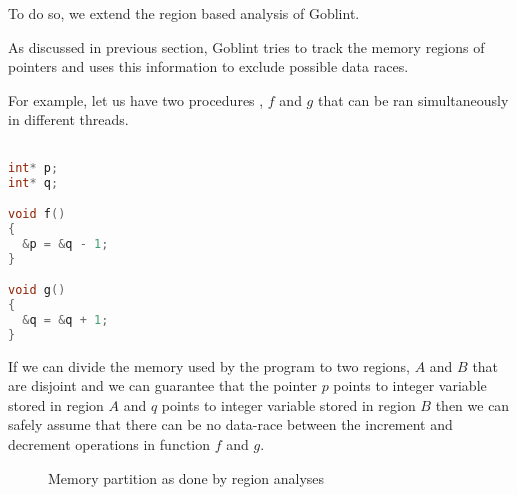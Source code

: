 \documentclass[..thesis.tex]{subfiles}
\begin{document}

To do so, we extend the region based analysis of Goblint.


As discussed in previous section, Goblint tries to track the memory regions of pointers and uses this information to exclude possible data races.


For example, let us have two procedures , $f$ and $g$ that can be ran simultaneously in different threads.

\begin{lstlisting}[language=c,style=def]

int* p;
int* q;

void f()
{
  &p = &q - 1; 
}

void g()
{
  &q = &q + 1; 
}

\end{lstlisting}

 

If we can divide the memory used by the program to two regions, $A$ and $B$ that are disjoint and we can guarantee that the pointer $p$ points
to integer variable stored in region $A$ and $q$ points to integer variable stored in region $B$ then we can safely assume that there
can be no data-race between the increment and decrement operations in function $f$ and $g$.

\begin{figure}[H]
  \centering
    \caption{Memory partition as done by region analyses}
\end{figure}
\end{document}
